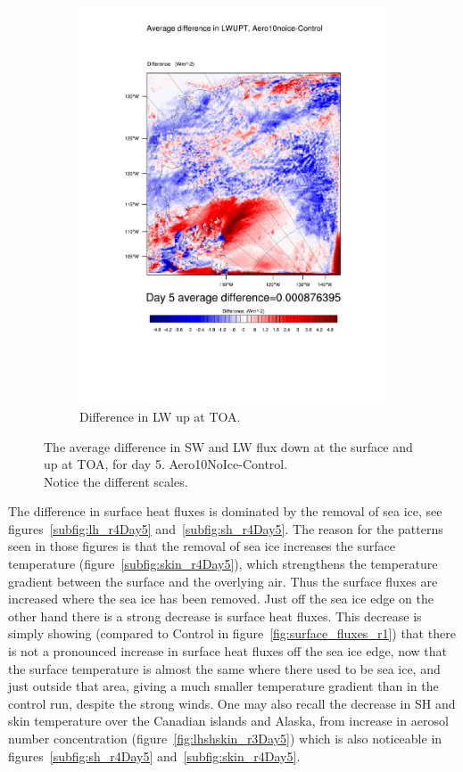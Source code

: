 \begin{figure}
\begin{subfigure}{0.48\textwidth}
		\includegraphics[width=\textwidth]{results/aero10ni/diff_Aero10NoIce_LWUPT_Day5.pdf}
		\caption{Difference in LW up at TOA.}
		\label{subfig:lwup_r4Day5}
	\end{subfigure}
	\caption{The average difference in SW and LW flux down at the surface and up at TOA, for day 5. Aero10NoIce-Control.\\Notice the different scales.}
	\label{fig:radiation_r4Day5}
\end{figure}

The difference in surface heat fluxes is dominated by the removal of sea ice, see figures~\ref{subfig:lh_r4Day5} and~\ref{subfig:sh_r4Day5}. The reason for the patterns seen in those figures is that the removal of sea ice increases the surface temperature (figure~\ref{subfig:skin_r4Day5}), which strengthens the temperature gradient between the surface and the overlying air. Thus the surface fluxes are increased where the sea ice has been removed. Just off the sea ice edge on the other hand there is a strong decrease is surface heat fluxes. This decrease is simply showing (compared to Control in figure~\ref{fig:surface_fluxes_r1}) that there is not a pronounced increase in surface heat fluxes off the sea ice edge, now that the surface temperature is almost the same where there used to be sea ice, and just outside that area, giving a much smaller temperature gradient than in the control run, despite the strong winds. One may also recall the decrease in SH and skin temperature over the Canadian islands and Alaska, from increase in aerosol number concentration (figure~\ref{fig:lhshskin_r3Day5}) which is also noticeable in figures~\ref{subfig:sh_r4Day5} and~\ref{subfig:skin_r4Day5}.

